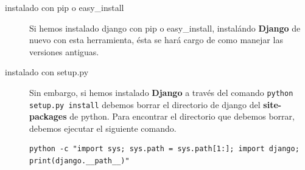 \begin{description}
\item[instalado con pip o easy\_install]
Si hemos instalado django con pip o easy\_install, instalándo \textbf{Django} de nuevo con esta herramienta, ésta se hará cargo de como manejar las versiones antiguas.

\item[instalado con setup.py]
Sin embargo, si hemos instalado \textbf{Django} a través del comando \texttt{python setup.py install} debemos borrar el directorio de django del \textbf{site-packages} de python. Para encontrar el directorio que debemos borrar, debemos ejecutar el siguiente comando.

\begin{lstlisting}
python -c "import sys; sys.path = sys.path[1:]; import django; print(django.__path__)"
\end{lstlisting}

\end{description}


